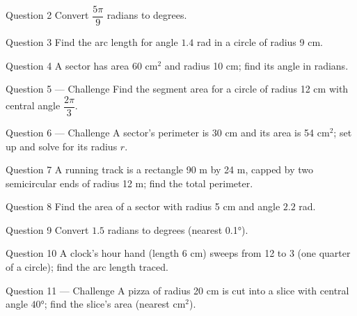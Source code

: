 \documentclass[11pt]{article}
\begin{document}
\begin{qbox}{Question 2}
Convert $\dfrac{5\pi}{9}$ radians to degrees.\workspace{2.4cm}
\end{qbox}

\begin{qbox}{Question 3}
Find the arc length for angle $1.4$ rad in a circle of radius 9 cm.\workspace{2.4cm}
\end{qbox}

\begin{qbox}{Question 4}
A sector has area 60 cm$^2$ and radius 10 cm; find its angle in radians.\workspace{2.4cm}
\end{qbox}

\begin{qbox}{Question 5 --- Challenge}
Find the segment area for a circle of radius 12 cm with central angle $\dfrac{2\pi}{3}$.\workspace{3.2cm}
\end{qbox}

\begin{qbox}{Question 6 --- Challenge}
A sector's perimeter is 30 cm and its area is 54 cm$^2$; set up and solve for its radius $r$.\workspace{3.6cm}
\end{qbox}

\begin{qbox}{Question 7}
A running track is a rectangle 90 m by 24 m, capped by two semicircular ends of radius 12 m; find the total perimeter.\workspace{2.4cm}
\end{qbox}

\begin{qbox}{Question 8}
Find the area of a sector with radius 5 cm and angle $2.2$ rad.\workspace{2.4cm}
\end{qbox}

\begin{qbox}{Question 9}
Convert $1.5$ radians to degrees (nearest 0.1°).\workspace{2.4cm}
\end{qbox}

\begin{qbox}{Question 10}
A clock's hour hand (length 6 cm) sweeps from 12 to 3 (one quarter of a circle); find the arc length traced.\workspace{2.4cm}
\end{qbox}

\begin{qbox}{Question 11 --- Challenge}
A pizza of radius 20 cm is cut into a slice with central angle $40°$; find the slice's area (nearest cm$^2$).\workspace{3.2cm}
\end{qbox}
\end{document}
